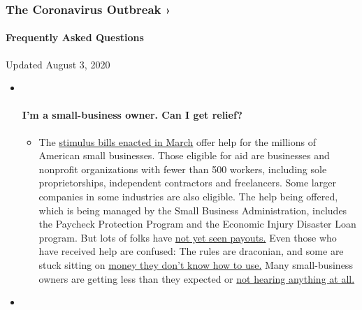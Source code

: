 \hypertarget{the-coronavirus-outbreak-}{%
\subsubsection{The Coronavirus Outbreak
›}\label{the-coronavirus-outbreak-}}

\hypertarget{frequently-asked-questions}{%
\paragraph{Frequently Asked
Questions}\label{frequently-asked-questions}}

Updated August 3, 2020

\begin{itemize}
\item ~
  \hypertarget{im-a-small-business-owner-can-i-get-relief}{%
  \paragraph{I'm a small-business owner. Can I get
  relief?}\label{im-a-small-business-owner-can-i-get-relief}}

  \begin{itemize}
  \tightlist
  \item
    The
    \href{https://www.nytimes3xbfgragh.onion/article/small-business-loans-stimulus-grants-freelancers-coronavirus.html?action=click\&pgtype=Article\&state=default\&region=MAIN_CONTENT_3\&context=storylines_faq}{stimulus
    bills enacted in March} offer help for the millions of American
    small businesses. Those eligible for aid are businesses and
    nonprofit organizations with fewer than 500 workers, including sole
    proprietorships, independent contractors and freelancers. Some
    larger companies in some industries are also eligible. The help
    being offered, which is being managed by the Small Business
    Administration, includes the Paycheck Protection Program and the
    Economic Injury Disaster Loan program. But lots of folks have
    \href{https://www.nytimes3xbfgragh.onion/interactive/2020/05/07/business/small-business-loans-coronavirus.html?action=click\&pgtype=Article\&state=default\&region=MAIN_CONTENT_3\&context=storylines_faq}{not
    yet seen payouts.} Even those who have received help are confused:
    The rules are draconian, and some are stuck sitting on
    \href{https://www.nytimes3xbfgragh.onion/2020/05/02/business/economy/loans-coronavirus-small-business.html?action=click\&pgtype=Article\&state=default\&region=MAIN_CONTENT_3\&context=storylines_faq}{money
    they don't know how to use.} Many small-business owners are getting
    less than they expected or
    \href{https://www.nytimes3xbfgragh.onion/2020/06/10/business/Small-business-loans-ppp.html?action=click\&pgtype=Article\&state=default\&region=MAIN_CONTENT_3\&context=storylines_faq}{not
    hearing anything at all.}
  \end{itemize}
\item ~
  \hypertarget{what-are-my-rights-if-i-am-worried-about-going-back-to-work}{%
}
\end{itemize}
